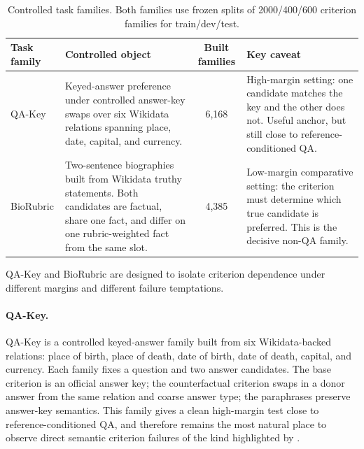 \documentclass[11pt]{article}
\newcommand{\qakey}{QA-Key\xspace}
\newcommand{\biorubric}{BioRubric\xspace}
\begin{document}
\begin{table}[t]
  \centering
  \small
  \begin{threeparttable}
  \caption{Controlled task families. Both families use frozen splits of 2000/400/600 criterion families for train/dev/test.}
  \label{tab:datasets}
  \begin{tabularx}{\columnwidth}{@{}l>{\raggedright\arraybackslash}Xc>{\raggedright\arraybackslash}X@{}}
    \toprule
    Task family & Controlled object & Built families & Key caveat \\
    \midrule
    \qakey & Keyed-answer preference under controlled answer-key swaps over six Wikidata relations spanning place, date, capital, and currency. & 6,168 & High-margin setting: one candidate matches the key and the other does not. Useful anchor, but still close to reference-conditioned QA. \\
    \addlinespace[2pt]
    \biorubric & Two-sentence biographies built from Wikidata truthy statements. Both candidates are factual, share one fact, and differ on one rubric-weighted fact from the same slot. & 4,385 & Low-margin comparative setting: the criterion must determine which true candidate is preferred. This is the decisive non-QA family. \\
    \bottomrule
  \end{tabularx}
  \end{threeparttable}
\end{table}

\qakey and \biorubric are designed to isolate criterion dependence under different margins and different failure temptations.

\paragraph{QA-Key.}
\qakey is a controlled keyed-answer family built from six Wikidata-backed relations: place of birth, place of death, date of birth, date of death, capital, and currency. Each family fixes a question and two answer candidates. The base criterion is an official answer key; the counterfactual criterion swaps in a donor answer from the same relation and coarse answer type; the paraphrases preserve answer-key semantics. This family gives a clean high-margin test close to reference-conditioned QA, and therefore remains the most natural place to observe direct semantic criterion failures of the kind highlighted by \citet{lee2026judging}.
\end{document}
